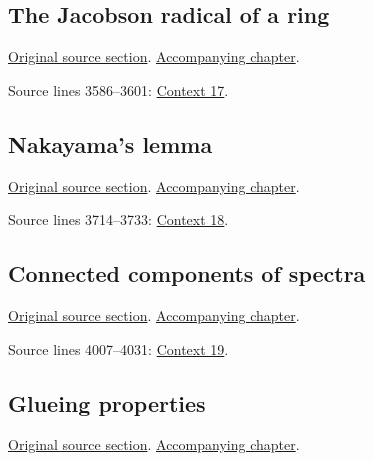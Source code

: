 \subsection{The Jacobson radical of a ring}
\hypertarget{algebra-source-section-radical}{}
\noindent\href{https://github.com/stacks/stacks-project/blob/a04446e57ec1fbc252a871afcec7752fb2807b14/algebra.tex\#L3546}{Original source section}. \href{algebra.pdf\#nameddest=section-radical}{Accompanying chapter}.

\begin{AlgebraSourceRoutes}
\item[ALGEBRA-RECON-059] Source lines 3586--3601: \hyperlink{algebra-context-017}{Context 17}.
\end{AlgebraSourceRoutes}

\subsection{Nakayama's lemma}
\hypertarget{algebra-source-section-nakayama}{}
\noindent\href{https://github.com/stacks/stacks-project/blob/a04446e57ec1fbc252a871afcec7752fb2807b14/algebra.tex\#L3606}{Original source section}. \href{algebra.pdf\#nameddest=section-nakayama}{Accompanying chapter}.

\begin{AlgebraSourceRoutes}
\item[ALGEBRA-RECON-060] Source lines 3714--3733: \hyperlink{algebra-context-018}{Context 18}.
\end{AlgebraSourceRoutes}

\subsection{Connected components of spectra}
\hypertarget{algebra-source-section-connected-components}{}
\noindent\href{https://github.com/stacks/stacks-project/blob/a04446e57ec1fbc252a871afcec7752fb2807b14/algebra.tex\#L3958}{Original source section}. \href{algebra.pdf\#nameddest=section-connected-components}{Accompanying chapter}.

\begin{AlgebraSourceRoutes}
\item[ALGEBRA-RECON-064] Source lines 4007--4031: \hyperlink{algebra-context-019}{Context 19}.
\end{AlgebraSourceRoutes}

\subsection{Glueing properties}
\hypertarget{algebra-source-section-more-glueing}{}
\noindent\href{https://github.com/stacks/stacks-project/blob/a04446e57ec1fbc252a871afcec7752fb2807b14/algebra.tex\#L4041}{Original source section}. \href{algebra.pdf\#nameddest=section-more-glueing}{Accompanying chapter}.


